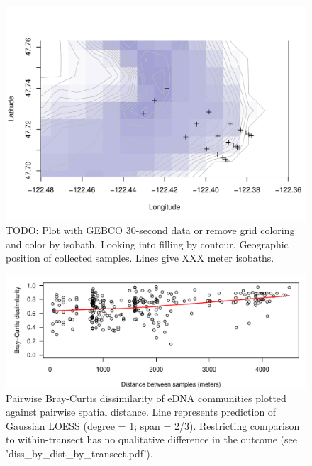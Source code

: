 \documentclass[11pt,letterpaper]{article} %
\begin{document}
\begin{figure}[h!] %
  \centering
    \includegraphics[width=1\textwidth]{../../Figures/site_map.pdf}
    \caption{TODO: Plot with GEBCO 30-second data or remove grid coloring and color by isobath. Looking into filling by contour. Geographic position of collected samples. Lines give XXX meter isobaths.}
  \label{site_map} %
\end{figure}

\begin{figure}[h!] %
  \centering
    \includegraphics[width=1\textwidth]{../../Figures/diss_by_dist.pdf}
    \caption{Pairwise Bray-Curtis dissimilarity of eDNA communities plotted against pairwise spatial distance.
    Line represents prediction of Gaussian LOESS (degree = 1; span = 2/3).
    Restricting comparison to within-transect has no qualitative difference in the outcome (see 'diss\_by\_dist\_by\_transect.pdf').
    }
  \label{comm_diss_by_geo_dist} %
\end{figure}
\end{document}
